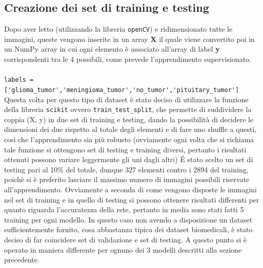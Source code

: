 \subsection{Creazione dei set di training e testing}
Dopo aver letto (utilizzando la libreria \lstinline{openCV}) e ridimensionato tutte le immagini,
 queste vengono inserite in un array \textbf{X} il quale
 viene convertito poi in un NumPy array in cui ogni elemento è associato all'array di label \textbf{y} corrispondenti tra le 4 possibili, 
  come prevede  l'apprendimento supervisionato.\\ \\
 \lstinline{labels = ['glioma_tumor','meningioma_tumor','no_tumor','pituitary_tumor']} \\
 
  Questa volta per questo tipo di dataset è stato deciso di utilizzare la funzione  della libreria \lstinline{scikit}
 ovvero \lstinline{train_test_split}, che permette di suddividere la coppia (X, y) in due set di training e testing,
  dando la possibilità di decidere le dimensioni dei due rispetto al totale degli elementi
   e di fare uno shuffle a questi,
  così che l'apprendimento sia più robusto (ovviamente ogni volta che si richiama tale funzione si ottengono 
  set di testing e training diversi,
   pertanto i risultati ottenuti possono variare leggermente gli uni dagli altri) É stato scelto un set di
    testing pari al 10\% del totale, dunque 327 elementi 
  contro i 2894 del training, poichè si è preferito lasciare il massimo numero di immagini possibili
   riservate all'apprendimento.
  Ovviamente a seconda di come vengono disposte le immagini nel set di training e in quello di testing si possono 
  ottenere risultati differenti per quanto riguarda l'accuratezza della rete, pertanto in media sono
   stati fatti 5 training per ogni modello.
   In questo caso non avendo a disposizione
   un dataset sufficientemente fornito, cosa abbastanza tipica dei dataset biomedicali, è stato deciso 
   di far coincidere set di validazione e set di testing. 
  A questo punto si è operato in maniera differente per ognuno dei 3 modelli 
  descritti alla sezione precedente. 
